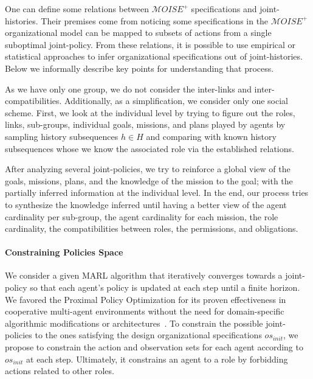 One can define some relations between $\mathcal{M}OISE^+$ specifications and joint-histories. Their premises come from noticing some specifications in the $\mathcal{M}OISE^+$ organizational model can be mapped to subsets of actions from a single suboptimal joint-policy.
From these relations, it is possible to use empirical or statistical approaches to infer organizational specifications out of joint-histories. Below we informally describe key points for understanding that process.

As we have only one group, we do not consider the inter-links and inter-compatibilities. Additionally, as a simplification, we consider only one social scheme.
First, we look at the individual level by trying to figure out the roles, links, sub-groups, individual goals, missions, and plans played by agents by sampling history subsequences $h \in H$ and comparing with known history subsequences whose we know the associated role via the established relations.

After analyzing several joint-policies, we try to reinforce a global view of the goals, missions, plans, and the knowledge of the mission to the goal; with the partially inferred information at the individual level.
In the end, our process tries to synthesize the knowledge inferred until having a better view of the agent cardinality per sub-group, the agent cardinality for each mission, the role cardinality, the compatibilities between roles, the permissions, and obligations.

\paragraph{\textbf{Constraining Policies Space}}

We consider a given MARL algorithm that iteratively converges towards a joint-policy so that each agent's policy is updated at each step until a finite horizon.
We favored the Proximal Policy Optimization for its proven effectiveness in cooperative multi-agent environments without the need for domain-specific algorithmic modifications or architectures~\cite{Yu2022}.
To constrain the possible joint-policies to the ones satisfying the design organizational specifications $os_{init}$, we propose to constrain the action and observation sets for each agent according to $os_{init}$ at each step. Ultimately, it constrains an agent to a role by forbidding actions related to other roles.

